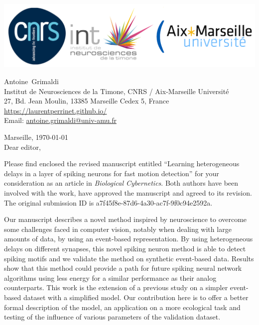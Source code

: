 \documentclass[10pt,english]{article}
\makeatletter
\newcommand{\LastName}{Grimaldi}%
\newcommand{\FirstName}{Antoine}%
\newcommand{\Institute}{Institut de Neurosciences de la Timone, CNRS / Aix-Marseille Universit\'e}%
\newcommand{\Address}{27, Bd. Jean Moulin, 13385 Marseille Cedex 5, France}%
\newcommand{\Website}{\url{https://laurentperrinet.github.io/}}%
\newcommand{\Email}{\url{antoine.grimaldi@univ-amu.fr}}%
\makeatother
\begin{document}
\includegraphics[width=.4\textwidth]{troislogos.png}
\\
\vspace{.1\baselineskip}
\hrulefill
\vspace{.1\baselineskip}

\begin{flushright}
	\FirstName\  \LastName\  \\
	\Institute\\[6pt]
	\Address\\%
	\Website \\
	  Email: \Email \\[6pt]
\end{flushright}
\justifying
\vspace{1\baselineskip}
Marseille, 
\today
\\[12pt] %
	
Dear editor,

Please find enclosed the revised manuscript entitled ``Learning heterogeneous delays in a layer of spiking neurons for fast motion detection'' for your consideration as an article in \emph{Biological Cybernetics}. Both authors have been involved with the work, have approved the manuscript and agreed to its revision. The original submission ID is a7f45f8e-87d6-4a30-ac7f-9f0c94e2592a. 

Our manuscript describes a novel method inspired by neuroscience to overcome some challenges faced in computer vision, notably when dealing with large amounts of data, by using an event-based representation. By using heterogeneous delays on different synapses, this novel spiking neuron method is able to detect spiking motifs and we validate the method on synthetic event-based data. Results show that this method could provide a path for future spiking neural network algorithms using less energy for a similar performance as their analog counterparts. This work is the extension of a previous study on a simpler event-based dataset with a simplified model. Our contribution here is to offer a better formal description of the model, an application on a more ecological task and testing of the influence of various parameters of the validation dataset.
\end{document}
